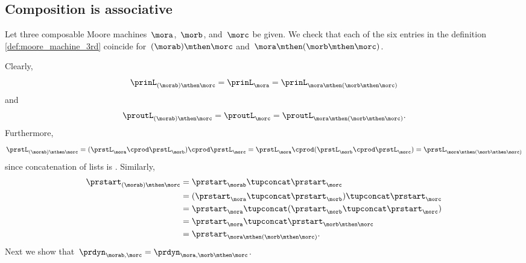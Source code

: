 \subsection{Composition is associative}

Let three composable Moore machines~$\mora$,~$\morb$, and~$\morc$ be given.
We check that each of the six entries in the definition \cref{def:moore_machine_3rd} coincide for~$(\morab) \mthen \morc$ and~$\mora \mthen (\morb \mthen \morc)$.

Clearly,
\begin{equation}
    \prinL_{(\morab)\mthen \morc}  = \prinL_{\mora} =\prinL_{\mora \mthen (\morb \mthen \morc)}
\end{equation}
and
\begin{equation}
    \proutL_{(\morab)\mthen \morc}  =\proutL_\morc = \proutL_{\mora \mthen (\morb \mthen \morc)}.
\end{equation}
Furthermore,
\begin{equation}
    \prstL_{(\morab)\mthen \morc} =  (\prstL_{\mora} \cprod \prstL_{\morb}) \cprod  \prstL_{\morc}  =  \prstL_{\mora} \cprod (\prstL_{\morb} \cprod  \prstL_{\morc}) =\prstL_{\mora \mthen (\morb \mthen \morc)}
\end{equation}
since concatenation of lists is .
Similarly,
\begin{equation}
    \begin{aligned}
        \prstart_{(\morab)\mthen \morc} & = \prstart_{\morab} \tupconcat \prstart_{\morc} \\
                                        & =  (\prstart_{\mora } \tupconcat \prstart_{\morb}) \tupconcat \prstart_{\morc} \\
                                        & = \prstart_{\mora } \tupconcat (\prstart_{\morb} \tupconcat \prstart_{\morc}) \\
                                        & = \prstart_{\mora } \tupconcat \prstart_{ \morb \mthen\morc} \\
                                        & = \prstart_{\mora \mthen (\morb \mthen \morc)}.
    \end{aligned}
\end{equation}
Next we show that~$\prdyn_{\morab, \morc} = \prdyn_{\mora, \morb \mthen \morc}$.

